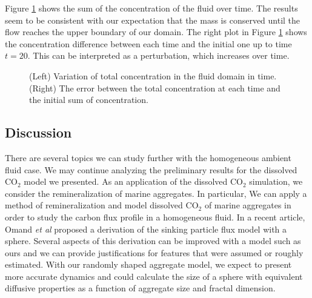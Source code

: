 Figure \ref{fig_sumC} shows the sum of the concentration of the fluid over time.
The results seem to be consistent with our expectation that the mass is conserved until the flow reaches the upper boundary of our domain. The right plot in Figure \ref{fig_sumC} shows the concentration difference between each time and the initial one up to time $t = 20$. This can be interpreted as a perturbation, which increases over time.  
 \begin{figure}[ht]
 \begin{center}
 \end{center}
 \caption{(Left) Variation of total concentration in the fluid domain in time. (Right) The error between the total concentration at each time and the initial sum of concentration.}
 \label{fig_sumC}
 \end{figure}
 \subsection{Discussion}
 
 There are several topics we can study further with the homogeneous ambient fluid case. We may continue analyzing the preliminary results for the dissolved CO$_2$ model we presented.
 As an application of the dissolved CO$_2$ simulation, we consider the remineralization of marine aggregates. In particular, We can apply a method of remineralization and model dissolved CO$_2$ of marine aggregates in order to study the carbon flux profile in a homogeneous fluid.
 In a recent article, Omand {\it{et al}} \cite{omand_sinking_2020} proposed a derivation of the sinking particle flux model with a sphere.
 Several aspects of this derivation can be improved with a model such as ours and we can provide justifications for features that were assumed or roughly estimated.
  With our randomly shaped aggregate model, we expect to present more accurate dynamics and could calculate the size of a sphere with equivalent diffusive properties as a function of aggregate size and fractal dimension.
